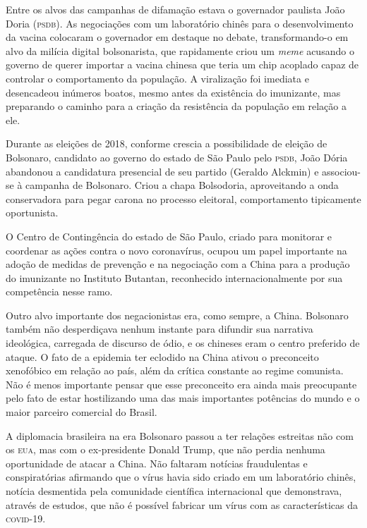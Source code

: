 Entre os alvos das campanhas de difamação estava o governador paulista
João Doria (\textsc{psdb}). As negociações com um laboratório chinês para o
desenvolvimento da vacina colocaram o governador em destaque no debate,
transformando-o em alvo da milícia digital bolsonarista, que rapidamente
criou um \textit{meme} acusando o governo de querer importar a vacina chinesa que
teria um chip acoplado capaz de controlar o comportamento da população.
A viralização foi imediata e desencadeou inúmeros boatos, mesmo antes da
existência do imunizante, mas preparando o caminho para a criação da
resistência da população em relação a ele.

Durante as eleições de 2018, conforme crescia a possibilidade de eleição
de Bolsonaro, candidato ao governo do estado de São Paulo pelo \textsc{psdb}, João
Dória abandonou a candidatura presencial de seu partido (Geraldo
Alckmin) e associou-se à campanha de Bolsonaro. Criou a chapa
Bolsodoria, aproveitando a onda conservadora para pegar carona no
processo eleitoral, comportamento tipicamente oportunista.

O Centro de Contingência do estado de São Paulo, criado para monitorar e
coordenar as ações contra o novo coronavírus, ocupou um papel importante
na adoção de medidas de prevenção e na negociação com a China para a
produção do imunizante no Instituto Butantan, reconhecido
internacionalmente por sua competência nesse ramo.

Outro alvo importante dos negacionistas era, como sempre, a China.
Bolsonaro também não desperdiçava nenhum instante para difundir sua
narrativa ideológica, carregada de discurso de ódio, e os chineses eram
o centro preferido de ataque. O fato de a epidemia ter eclodido na China
ativou o preconceito xenofóbico em relação ao país, além da crítica
constante ao regime comunista. Não é menos importante pensar que esse
preconceito era ainda mais preocupante pelo fato de estar hostilizando
uma das mais importantes potências do mundo e o maior parceiro comercial
do Brasil.

A diplomacia brasileira na era Bolsonaro passou a ter relações estreitas
não com os \textsc{eua}, mas com o ex-presidente Donald Trump, que não perdia
nenhuma oportunidade de atacar a China. Não faltaram notícias
fraudulentas e conspiratórias afirmando que o vírus havia sido criado em
um laboratório chinês, notícia desmentida pela comunidade científica
internacional que demonstrava, através de estudos, que não é possível
fabricar um vírus com as características da \textsc{covid-19}.

